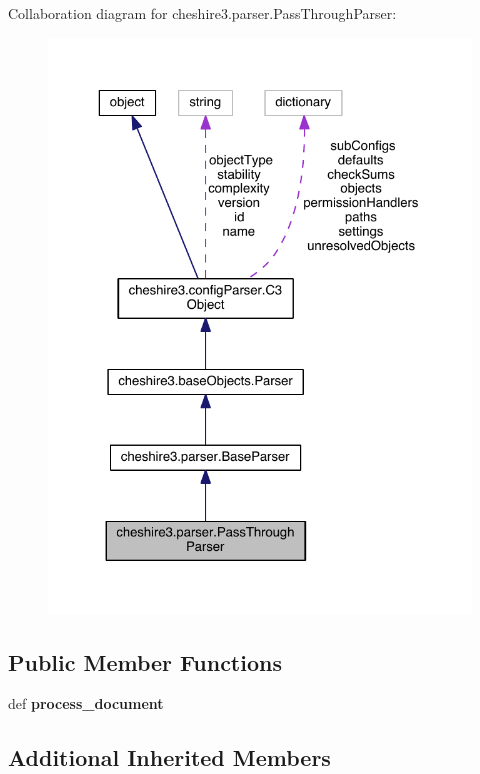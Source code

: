 Collaboration diagram for cheshire3.\-parser.\-Pass\-Through\-Parser\-:
\nopagebreak
\begin{figure}[H]
\begin{center}
\leavevmode
\includegraphics[width=325pt]{classcheshire3_1_1parser_1_1_pass_through_parser__coll__graph}
\end{center}
\end{figure}
\subsection*{Public Member Functions}
\begin{DoxyCompactItemize}
\item 
\hypertarget{classcheshire3_1_1parser_1_1_pass_through_parser_a0c393e77228d87a71f736c4c4ef918cf}{def {\bfseries process\-\_\-document}}\label{classcheshire3_1_1parser_1_1_pass_through_parser_a0c393e77228d87a71f736c4c4ef918cf}

\end{DoxyCompactItemize}
\subsection*{Additional Inherited Members}


